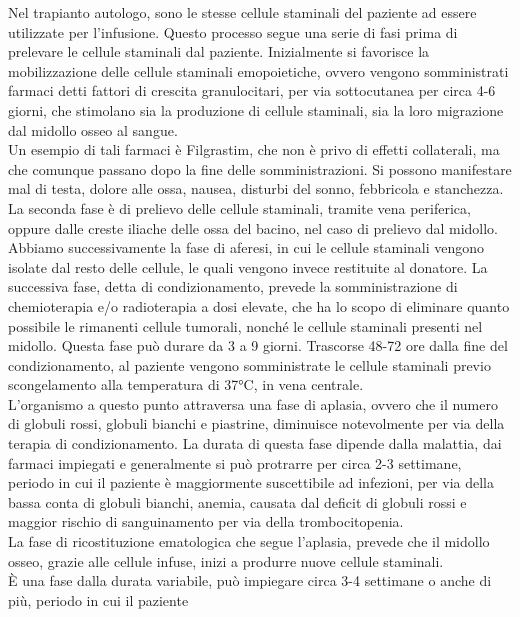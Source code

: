Nel trapianto autologo, sono le stesse cellule staminali del paziente ad essere utilizzate per l’infusione. 
Questo  processo segue una serie di fasi prima di prelevare le cellule staminali dal paziente. Inizialmente si 
favorisce  la mobilizzazione delle cellule staminali emopoietiche, ovvero vengono somministrati farmaci detti fattori 
di crescita granulocitari, per via sottocutanea per circa 4-6 giorni, che stimolano sia la 
produzione di cellule staminali, sia la loro migrazione dal midollo osseo al sangue\cite{TRAPIANTO}.\\
Un esempio di tali farmaci è Filgrastim, che non è privo di effetti collaterali, ma che comunque passano dopo la fine 
delle somministrazioni. Si possono manifestare mal di testa, dolore alle ossa, nausea, disturbi del sonno, 
febbricola e stanchezza\cite{STEMCELLS}.\\
La seconda fase è di prelievo delle cellule staminali, tramite vena periferica, oppure dalle creste iliache delle 
ossa del bacino, nel caso di prelievo dal midollo. 
Abbiamo successivamente la fase di aferesi, in cui le cellule staminali vengono isolate dal resto delle cellule, 
le quali vengono invece restituite al donatore. 
La successiva fase, detta di condizionamento, prevede la somministrazione di chemioterapia e/o radioterapia a dosi 
elevate, che ha lo scopo di eliminare quanto possibile le rimanenti cellule tumorali, nonché le cellule staminali 
presenti nel midollo. Questa fase può durare da 3 a 9 giorni. Trascorse 48-72 ore dalla fine del condizionamento, 
al paziente vengono somministrate le cellule staminali previo scongelamento alla temperatura di 37°C, in vena centrale\cite{TRAPIANTO}.\\
L’organismo a questo punto attraversa una fase di aplasia, ovvero che il numero di globuli rossi, globuli bianchi e 
piastrine, diminuisce notevolmente per via della terapia di condizionamento. La durata di questa fase dipende 
dalla malattia, dai farmaci impiegati e generalmente si può protrarre per circa 2-3 settimane\cite{TRAPIANTO}, 
periodo in cui il paziente è maggiormente suscettibile ad infezioni, per via della bassa conta di globuli bianchi, 
anemia, causata dal deficit di globuli rossi e maggior rischio di sanguinamento per via della trombocitopenia\cite{LLSBLOOD}.\\
La fase di ricostituzione ematologica che segue l’aplasia, prevede che il midollo osseo, grazie alle cellule infuse, 
inizi a produrre nuove cellule staminali\cite{TRAPIANTO}.\\
È una fase dalla durata variabile, può impiegare circa 3-4 settimane o anche di più, periodo in cui il paziente 
